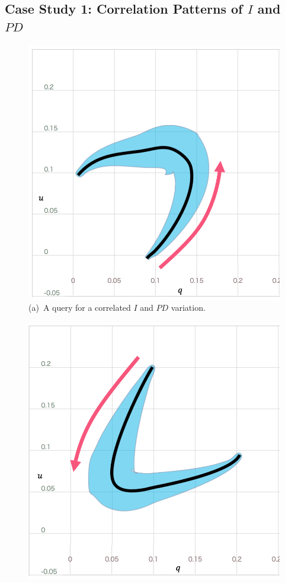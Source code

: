 \subsection{Case Study 1: Correlation Patterns of $I$ and $PD$}\label{sec:correlate}
\begin{figure}[tb]
    \centering
    \begin{minipage}{0.49\linewidth}
        \centering
        \includegraphics[width=.9\linewidth]{figures/QBScorrelate.png}\\
        \footnotesize{\sf(a)~A query for a correlated $I$ and $PD$ variation.}\\
    \end{minipage}
    \begin{minipage}{0.49\linewidth}
        \centering
        \includegraphics[width=.9\linewidth]{figures/QBSanticorrelate.png}\\

\end{minipage}
\end{figure}
